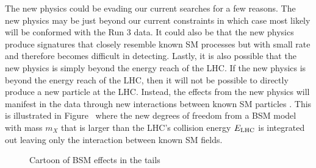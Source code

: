 \documentclass[10pt]{article}
\begin{document}
The new physics could be evading our current searches for a few reasons.
The new physics may be just beyond our current constraints in which case most likely will be conformed with the Run 3 data.
It could also be that the new physics produce signatures that closely resemble known SM processes but with small rate and therefore becomes difficult in detecting.
Lastly, it is also possible that the new physics is simply beyond the energy reach of the LHC.
If the new physics is beyond the energy reach of the LHC, then it will not be possible to directly produce a new particle at the LHC.
Instead, the effects from the new physics will manifest in the data through new interactions between known SM particles \cite{Weinberg:1978kz,Weinberg:1979sa,Buchmuller:1985jz}.
This is illustrated in Figure~ where the new degrees of freedom from a BSM model with mass $m_{X}$ that is larger than the LHC's collision energy $E_{\tiny\textrm{LHC}}$ is integrated out leaving only the interaction between known SM fields.

\begin{figure}[htb]
\centering
    \quad\quad
\caption{Cartoon of BSM effects in the tails}
\label{fig:BSMTails}
\end{figure}
\end{document}
